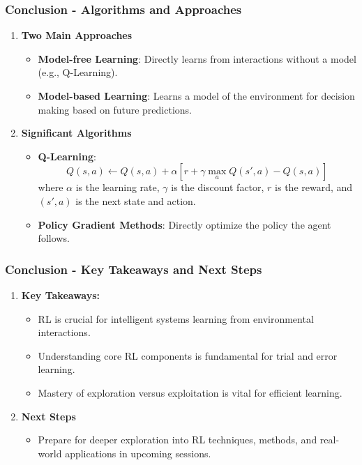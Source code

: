 \documentclass[aspectratio=169]{beamer}
\begin{document}
\begin{frame}[fragile]
    \frametitle{Conclusion - Algorithms and Approaches}
    \begin{enumerate}[resume]
        \item \textbf{Two Main Approaches}
        \begin{itemize}
            \item \textbf{Model-free Learning}: Directly learns from interactions without a model (e.g., Q-Learning).
            \item \textbf{Model-based Learning}: Learns a model of the environment for decision making based on future predictions.
        \end{itemize}

        \item \textbf{Significant Algorithms}
        \begin{itemize}
            \item \textbf{Q-Learning}: 
            \begin{equation}
                Q(s, a) \gets Q(s, a) + \alpha \left[ r + \gamma \max_a Q(s', a) - Q(s, a) \right]
            \end{equation}
            where $\alpha$ is the learning rate, $\gamma$ is the discount factor, $r$ is the reward, and $(s', a)$ is the next state and action.
            \item \textbf{Policy Gradient Methods}: Directly optimize the policy the agent follows.
        \end{itemize}
    \end{enumerate}
\end{frame}

\begin{frame}[fragile]
    \frametitle{Conclusion - Key Takeaways and Next Steps}
    \begin{enumerate}[1.]
        \item \textbf{Key Takeaways:}
        \begin{itemize}
            \item RL is crucial for intelligent systems learning from environmental interactions.
            \item Understanding core RL components is fundamental for trial and error learning.
            \item Mastery of exploration versus exploitation is vital for efficient learning.
        \end{itemize}
        
        \item \textbf{Next Steps}
        \begin{itemize}
            \item Prepare for deeper exploration into RL techniques, methods, and real-world applications in upcoming sessions.
        \end{itemize}
    \end{enumerate}
\end{frame}
\end{document}
